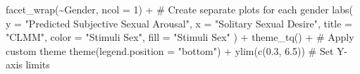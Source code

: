 \documentclass[
  bookmarksnumbered]{article}
\newenvironment{Shaded}{\begin{snugshade}}{\end{snugshade}}
\newcommand{\AttributeTok}[1]{\textcolor[rgb]{0.80,0.80,0.80}{#1}}
\newcommand{\CommentTok}[1]{\textcolor[rgb]{0.50,0.62,0.50}{#1}}
\newcommand{\DecValTok}[1]{\textcolor[rgb]{0.86,0.86,0.80}{#1}}
\newcommand{\FloatTok}[1]{\textcolor[rgb]{0.75,0.75,0.82}{#1}}
\newcommand{\FunctionTok}[1]{\textcolor[rgb]{0.94,0.94,0.56}{#1}}
\newcommand{\NormalTok}[1]{\textcolor[rgb]{0.80,0.80,0.80}{#1}}
\newcommand{\SpecialCharTok}[1]{\textcolor[rgb]{0.86,0.64,0.64}{#1}}
\newcommand{\StringTok}[1]{\textcolor[rgb]{0.80,0.58,0.58}{#1}}
\begin{document}
\begin{Shaded}
\begin{Highlighting}[]
  \FunctionTok{facet\_wrap}\NormalTok{(}\SpecialCharTok{\textasciitilde{}}\NormalTok{Gender, }\AttributeTok{ncol =} \DecValTok{1}\NormalTok{) }\SpecialCharTok{+} \CommentTok{\# Create separate plots for each gender}
  \FunctionTok{labs}\NormalTok{(}
    \AttributeTok{y =} \StringTok{"Predicted Subjective Sexual Arousal"}\NormalTok{, }\AttributeTok{x =} \StringTok{"Solitary Sexual Desire"}\NormalTok{,}
    \AttributeTok{title =} \StringTok{"CLMM"}\NormalTok{,}
    \AttributeTok{color =} \StringTok{"Stimuli Sex"}\NormalTok{, }\AttributeTok{fill =} \StringTok{"Stimuli Sex"}
\NormalTok{  ) }\SpecialCharTok{+}
  \FunctionTok{theme\_tq}\NormalTok{() }\SpecialCharTok{+} \CommentTok{\# Apply custom theme}
  \FunctionTok{theme}\NormalTok{(}\AttributeTok{legend.position =} \StringTok{"bottom"}\NormalTok{) }\SpecialCharTok{+}
  \FunctionTok{ylim}\NormalTok{(}\FunctionTok{c}\NormalTok{(}\FloatTok{0.3}\NormalTok{, }\FloatTok{6.5}\NormalTok{)) }\CommentTok{\# Set Y{-}axis limits}


\end{Highlighting}
\end{Shaded}
\end{document}
